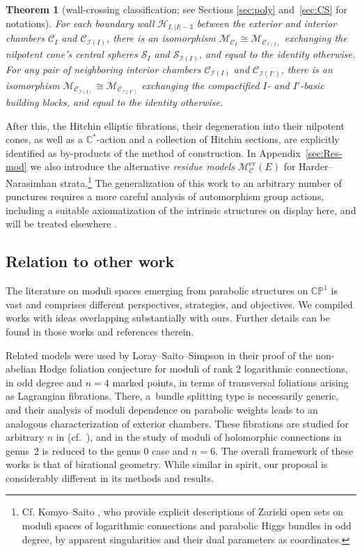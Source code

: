 \documentclass[pdftex]{sigma}
\newcommand{\field}[1]{\ensuremath{\mathbb{#1}}}
\newcommand{\CC}{\field{C}}
\newcommand{\PP}{\field{P}}
\newcommand{\curly}[1]{\mathscr{#1}}
\newcommand{\cM}{\curly{M}}
\newcommand{\cS}{\curly{S}}
\newcommand{\qC}{\mathcal{C}}
\newcommand{\qH}{\mathcal{H}}
\newcommand{\qI}{\mathcal{I}}
\numberwithin{equation}{section}
\newtheorem{Theorem}{Theorem}[section]
\begin{document}
\begin{Theorem}[wall-crossing classification; see Sections \ref{sec:poly} and~\ref{sec:CS} for notations]\label{theo:main-3}
For each boundary wall $\qH_{I,\vert I\vert -3}$ between the exterior and interior chambers $\qC_{I}$ and $\qC_{\qI(I)}$, there is an isomorphism $\cM_{\qC_{I}} \cong \cM_{\qC_{\qI(I)}}$ exchanging the nilpotent cone's central spheres $\cS_{I}$ and $\cS_{\qI(I)}$, and equal to the identity otherwise. For any pair of neighboring interior chambers $\qC_{\qI(I)}$ and $\qC_{\qI(I')}$, there is an isomorphism $\cM_{\qC_{\qI(I)}} \cong \cM_{\qC_{\qI(I')}}$ exchanging the compactified $I$- and $I'$-basic building blocks, and equal to the identity otherwise.
\end{Theorem}


After this, the Hitchin elliptic fibrations, their degeneration into their nilpotent cones, as well as a $\CC^{*}$-action and a collection of Hitchin sections, are explicitly identified as by-products of the method of construction. In Appendix~\ref{sec:Res-mod} we also introduce the alternative \textit{residue models} $\cM^{\mathrm{ev}}_{\qC}(E)$ for Harder--Narasimhan
strata.\footnote{Cf. Komyo--Saito \cite{KS19}, who provide explicit descriptions of Zariski open sets on moduli spaces of logarithmic connections and parabolic Higgs bundles in odd degree, by apparent singularities and their dual parameters as coordinates.} The generalization of this work to an arbitrary number of punctures requires a more careful analysis of automorphism group actions, including a suitable axiomatization of the intrinsic structures on display here, and will be treated elsewhere \cite{Mena}.




\subsection{Relation to other work}
The literature on moduli spaces emerging from parabolic structures on $\CC\PP^{1}$ is vast and comprises different perspectives, strategies, and objectives. We compiled works with ideas overlapping substantially with ours. Further details can be found in those works and references therein.

Related models were used by
Loray--Saito--Simpson \cite{LSS13}
in their proof of the non-abelian Hodge foliation conjecture for moduli of rank 2 logarithmic connections, in odd degree and $n=4$ marked points, in terms of transversal foliations arising as Lagrangian fibrations. There, a~bundle splitting type is necessarily generic, and their analysis of moduli dependence on parabolic weights leads to an analogous characterization of exterior chambers. These fibrations are studied for arbitrary $n$ in \cite{LS15} (cf.~\cite{KS19}), and in \cite{HL19} the study of moduli of holomorphic connections in genus~2 is reduced to the genus 0 case and $n=6$. The overall framework of these works is that of birational geometry. While similar in spirit, our proposal is considerably different in its methods and results.
\end{document}
